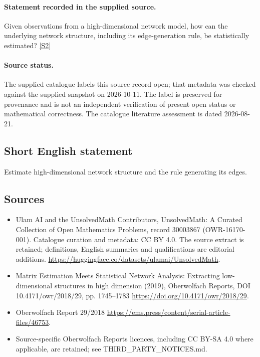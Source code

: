 \documentclass[11pt]{article}
\begin{document}
\paragraph{Statement recorded in the supplied source.}
Given observations from a high-dimensional network model, how can the underlying network structure, including its edge-generation rule, be statistically estimated? \href{https://doi.org/10.4171/owr/2018/29}{[S2]}
\paragraph{Source status.}
The supplied catalogue labels this source record open; that metadata was checked against the supplied snapshot on 2026-10-11. The label is preserved for provenance and is not an independent verification of present open status or mathematical correctness. The catalogue literature assessment is dated 2026-08-21.
\subsection{Short English statement}
Estimate high-dimensional network structure and the rule generating its edges.
\subsection{Sources}
\begin{itemize}
\item[S1] Ulam AI and the UnsolvedMath Contributors, UnsolvedMath: A Curated Collection of Open Mathematics Problems, record 30003867 (OWR-16170-001). Catalogue curation and metadata: CC BY 4.0. The source extract is retained; definitions, English summaries and qualifications are editorial additions.
\url{https://huggingface.co/datasets/ulamai/UnsolvedMath}.
\item[S2] Matrix Estimation Meets Statistical Network Analysis: Extracting low-dimensional structures in high dimension (2019), Oberwolfach Reports, DOI 10.4171/owr/2018/29, pp. 1745--1783
\url{https://doi.org/10.4171/owr/2018/29}.
\item[S3] Oberwolfach Report 29/2018
\url{https://ems.press/content/serial-article-files/46753}.
\item Source-specific Oberwolfach Reports licences, including CC BY-SA 4.0 where applicable, are retained; see THIRD\_PARTY\_NOTICES.md.
\end{itemize}
\end{document}
